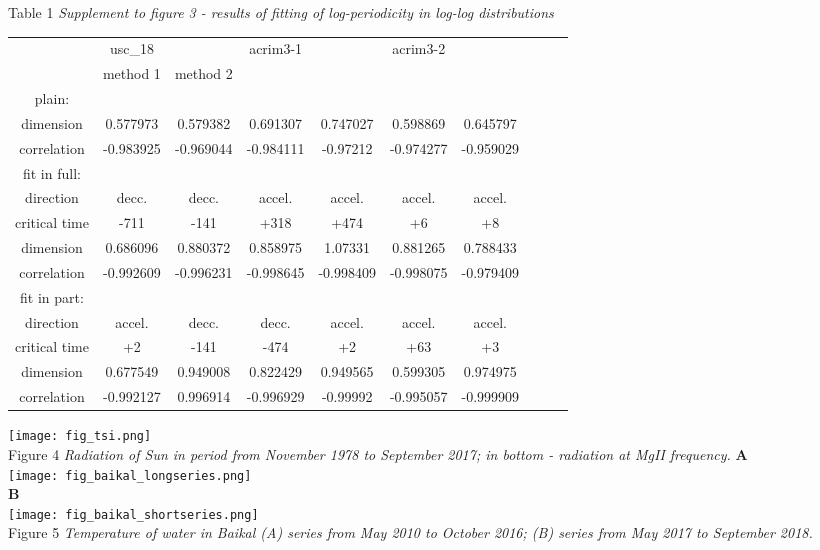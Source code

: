\documentclass[a4paper]{article}
\begin{document}
Table 1 \textit{Supplement to figure 3 - results of fitting of log-periodicity in log-log distributions}
\vskip 12pt
\begin{tabular}{cccccccccc}
\hline
             & usc\_18        &           & acrim3-1  &           & acrim3-2  &           \\
             & method 1       & method 2  &           &           &           &           \\
\hline
plain: \\
dimension     & 0.577973  & 0.579382  & 0.691307  & 0.747027  & 0.598869  & 0.645797  \\
correlation   & -0.983925 & -0.969044 & -0.984111 & -0.97212  & -0.974277 & -0.959029 \\
\hline
fit in full: \\ 
direction     & decc.     & decc.     & accel.    & accel.    & accel.    & accel.    \\
critical time & -711      & -141      & +318      & +474      & +6        & +8        \\
dimension     & 0.686096  & 0.880372  & 0.858975  & 1.07331   & 0.881265  & 0.788433  \\
correlation   & -0.992609 & -0.996231 & -0.998645 & -0.998409 & -0.998075 & -0.979409 \\
\hline
fit in part: \\
direction     & accel.    & decc.     & decc.     & accel.    & accel.    & accel.    \\
critical time & +2        & -141      & -474      & +2        & +63       & +3        \\
dimension     & 0.677549  & 0.949008  & 0.822429  & 0.949565  & 0.599305  & 0.974975  \\
correlation   & -0.992127 & 0.996914  & -0.996929 & -0.99992  & -0.995057 & -0.999909 \\
\hline
\end{tabular}

\newpage

\texttt{[image: fig\_tsi.png]}\\
\vskip 12pt
Figure 4 \textit{Radiation of Sun in period from November 1978 to September 2017; in bottom - radiation at MgII frequency. }
\vskip 12pt
{\large{\textbf{A}}}\\
\texttt{[image: fig\_baikal\_longseries.png]}\\
\vskip 12pt
{\large{\textbf{B}}}\\
\texttt{[image: fig\_baikal\_shortseries.png]}\\
\vskip 12pt
Figure 5 \textit{Temperature of water in Baikal (A) series from May 2010 to October 2016; (B) series from May 2017 to September 2018. }
\end{document}

